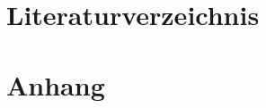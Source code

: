 \documentclass[12pt]{scrartcl}
\begin{document}


\newpage
\section{Literaturverzeichnis}
\printbibliography %
\newpage
\section*{Anhang}
\label{Ah:}
\renewcommand*{\thesubsection}{\Alph{subsection}}%
\end{document}
